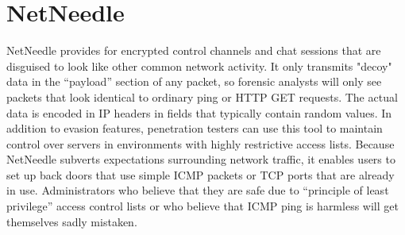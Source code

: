 
\section{NetNeedle}
NetNeedle provides for encrypted control channels and chat sessions that are disguised to look like other common network activity. 
It only transmits "decoy" data in the “payload” section of any packet, so forensic analysts will only see packets that look identical to ordinary ping or HTTP GET requests. 
The actual data is encoded in IP headers in fields that typically contain random values.
\vspace{1ex} \newline
In addition to evasion features, penetration testers can use this tool to maintain control over servers in environments with highly restrictive access lists. 
Because NetNeedle subverts expectations surrounding network traffic, it enables users to set up back doors that use simple ICMP packets or TCP ports that are already in use. 
Administrators who believe that they are safe due to “principle of least privilege” access control lists or who believe that ICMP ping is harmless will get themselves sadly mistaken.


